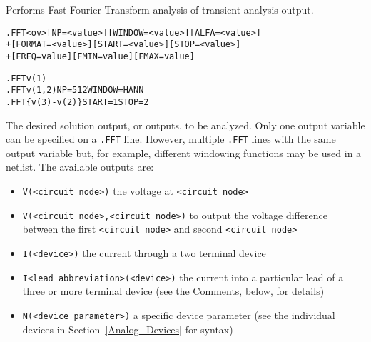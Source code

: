 



Performs Fast Fourier Transform analysis of transient analysis output.

\begin{Command}

\format
\begin{alltt}
.FFT <ov> [NP=<value>] [WINDOW=<value>] [ALFA=<value>]
+ [FORMAT=<value>] [START=<value>] [STOP=<value>]
+ [FREQ=value] [FMIN=value] [FMAX=value]
\end{alltt}

\examples
\begin{alltt}
.FFT v(1)
.FFT v(1,2) NP=512 WINDOW=HANN
.FFT \{v(3)-v(2)\} START=1 STOP=2
\end{alltt}

\arguments

\begin {Arguments}

The desired solution output, or outputs, to be analyzed. Only one
output variable can be specified on a {\tt .FFT} line. However,
multiple {\tt .FFT} lines with the same output variable but, for
example, different windowing functions may be used in a netlist.
The available outputs are:

\begin{itemize}
  \item \texttt{V(<circuit node>)} the voltage at \texttt{<circuit node>}
  \item \texttt{V(<circuit node>,<circuit node>)} to output the voltage
    difference between the first \texttt{<circuit node>} and second
    \texttt{<circuit node>}
  \item \texttt{I(<device>)} the current through a two terminal device
  \item \texttt{I<lead abbreviation>(<device>)} the current into a particular lead
    of a three or more terminal device (see the Comments, below, for details)
  \item \texttt{N(<device parameter>)} a specific device parameter (see the
    individual devices in Section~\ref{Analog_Devices} for syntax)
\end{itemize}


\end{Arguments}
\end{Command}
